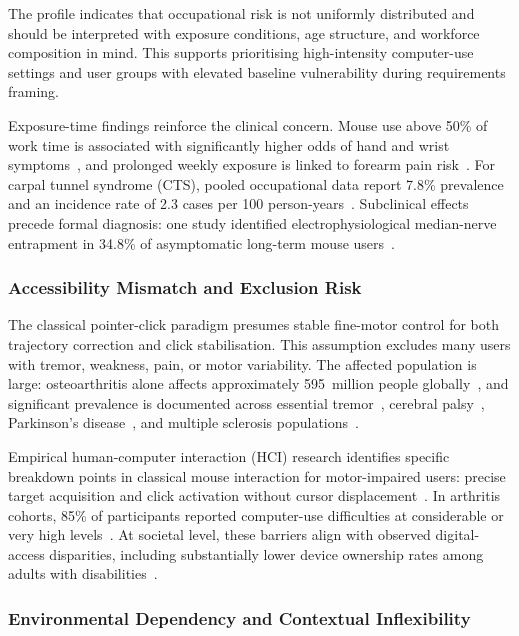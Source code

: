 The profile indicates that occupational risk is not uniformly distributed and should be interpreted with exposure conditions, age structure, and workforce composition in mind. This supports prioritising high-intensity computer-use settings and user groups with elevated baseline vulnerability during requirements framing.

Exposure-time findings reinforce the clinical concern. Mouse use above 50\% of work time is associated with significantly higher odds of hand and wrist symptoms~\cite{andersen2003mouse}, and prolonged weekly exposure is linked to forearm pain risk~\cite{thomsen2008mouse}. For carpal tunnel syndrome (CTS), pooled occupational data report 7.8\% prevalence and an incidence rate of 2.3 cases per 100 person-years~\cite{dale2013cts}. Subclinical effects precede formal diagnosis: one study identified electrophysiological median-nerve entrapment in 34.8\% of asymptomatic long-term mouse users~\cite{ali2010median}.

\subsubsection{Accessibility Mismatch and Exclusion Risk}

The classical pointer-click paradigm presumes stable fine-motor control for both trajectory correction and click stabilisation. This assumption excludes many users with tremor, weakness, pain, or motor variability. The affected population is large: osteoarthritis alone affects approximately 595~million people globally~\cite{gbd2023oa}, and significant prevalence is documented across essential tremor~\cite{zheng2021essential}, cerebral palsy~\cite{mcintyre2022cp}, Parkinson's disease~\cite{maserejian2020parkinson}, and multiple sclerosis populations~\cite{lamers2016upperlimb}.

Empirical human-computer interaction (HCI) research identifies specific breakdown points in classical mouse interaction for motor-impaired users: precise target acquisition and click activation without cursor displacement~\cite{wobbrock2008goal}. In arthritis cohorts, 85\% of participants reported computer-use difficulties at considerable or very high levels~\cite{baker2009arthritis}. At societal level, these barriers align with observed digital-access disparities, including substantially lower device ownership rates among adults with disabilities~\cite{perrin2021disabilitytech}.

\subsubsection{Environmental Dependency and Contextual Inflexibility}

